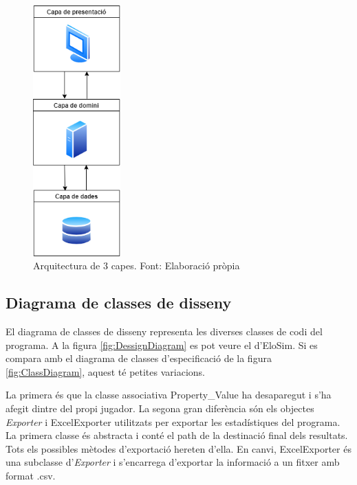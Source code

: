 \documentclass[a4paper]{article}
\begin{document}
\begin{figure}[H]
    \centering
    \includegraphics[width=0.3\textwidth]{images/3-capes.png}
    \caption{Arquitectura de 3 capes. Font: Elaboració pròpia}
    \label{fig:ArchitectureCapes}
\end{figure}

\subsection{Diagrama de classes de disseny}

El diagrama de classes de disseny representa les diverses classes de codi del programa.  A la figura \ref{fig:DessignDiagram} es pot veure el d'EloSim. Si es compara amb el diagrama de classes d'especificació de la figura \ref{fig:ClassDiagram}, aquest té petites variacions.

La primera és que la classe associativa Property\_Value ha desaparegut i s'ha afegit dintre del propi jugador. La segona gran diferència són els objectes \textit{Exporter} i ExcelExporter utilitzats per exportar les estadístiques del programa. La primera classe és abstracta i conté el path de la destinació final dels resultats. Tots els possibles mètodes d'exportació hereten d'ella. En canvi, ExcelExporter és una subclasse d'\textit{Exporter} i s'encarrega d'exportar la informació a un fitxer amb format .csv.
\end{document}
